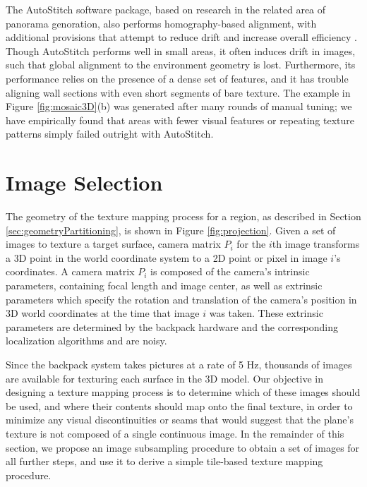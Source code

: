 \documentclass[]{spie}  %
\begin{document}
The AutoStitch software package, based on research in the related area
of panorama genoration, also performs homography-based alignment, with
additional provisions that attempt to reduce drift and increase
overall efficiency \cite{panorama2d, autostitch}. Though AutoStitch
performs well in small areas, it often induces drift in images,
such that global alignment to the environment geometry is
lost. Furthermore, its performance relies on the presence of a dense
set of features, and it has trouble aligning wall sections with even
short segments of bare texture. The example in Figure
\ref{fig:mosaic3D}(b) was generated after many rounds of manual
tuning; we have empirically found that areas with fewer visual
features or repeating texture patterns simply failed outright with
AutoStitch.


\section{Image Selection}
\label{sec:imageSelection}

The geometry of the texture mapping process for a region, as described
in Section \ref{sec:geometryPartitioning}, is shown in Figure
\ref{fig:projection}. Given a set of images to texture a target
surface, camera matrix $P_i$ for the $i$th image transforms a 3D point
in the world coordinate system to a 2D point or pixel in image $i$'s
coordinates. A camera matrix $P_i$ is composed of the camera's
intrinsic parameters, containing focal length and image center, as
well as extrinsic parameters which specify the rotation and
translation of the camera's position in 3D world coordinates at the
time that image $i$ was taken. These extrinsic parameters are
determined by the backpack hardware and the corresponding localization
algorithms \cite{chen2010indoor, liu2010indoor, kua2012loopclosure}
and are noisy.

Since the backpack system takes pictures at a rate of 5 Hz, thousands
of images are available for texturing each surface in the 3D
model. Our objective in designing a texture mapping process is to
determine which of these images should be used, and where their
contents should map onto the final texture, in order to minimize any
visual discontinuities or seams that would suggest that the plane's
texture is not composed of a single continuous image. In the remainder
of this section, we propose an image subsampling procedure to obtain a
set of images for all further steps, and use it to derive a simple
tile-based texture mapping procedure.
\end{document}
